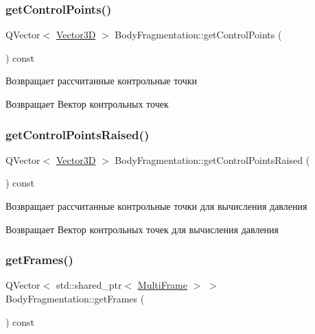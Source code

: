 \subsubsection{\texorpdfstring{get\+Control\+Points()}{getControlPoints()}}
{\footnotesize\ttfamily Q\+Vector$<$ \mbox{\hyperlink{class_vector3_d}{Vector3D}} $>$ Body\+Fragmentation\+::get\+Control\+Points (\begin{DoxyParamCaption}{ }\end{DoxyParamCaption}) const}

Возвращает рассчитанные контрольные точки \begin{DoxyReturn}{Возвращает}
Вектор контрольных точек 
\end{DoxyReturn}
\mbox{\label{class_body_fragmentation_a204136fe52dcd14b632e8fbc1a8e4124}} 
\subsubsection{\texorpdfstring{get\+Control\+Points\+Raised()}{getControlPointsRaised()}}
{\footnotesize\ttfamily Q\+Vector$<$ \mbox{\hyperlink{class_vector3_d}{Vector3D}} $>$ Body\+Fragmentation\+::get\+Control\+Points\+Raised (\begin{DoxyParamCaption}{ }\end{DoxyParamCaption}) const}

Возвращает рассчитанные контрольные точки для вычисления давления \begin{DoxyReturn}{Возвращает}
Вектор контрольных точек для вычисления давления 
\end{DoxyReturn}
\mbox{\label{class_body_fragmentation_aa6ac4c08d3f49c4e4d52cb7777b04bf9}} 
\subsubsection{\texorpdfstring{get\+Frames()}{getFrames()}}
{\footnotesize\ttfamily Q\+Vector$<$ std\+::shared\+\_\+ptr$<$ \mbox{\hyperlink{class_multi_frame}{Multi\+Frame}} $>$ $>$ Body\+Fragmentation\+::get\+Frames (\begin{DoxyParamCaption}{ }\end{DoxyParamCaption}) const}

